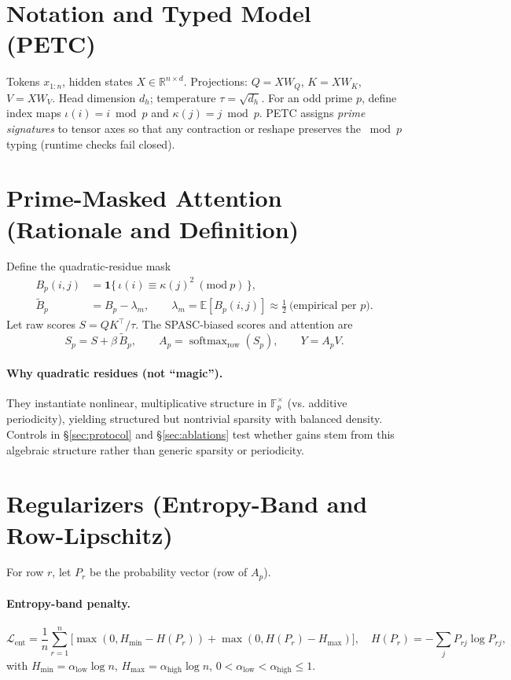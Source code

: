 \documentclass[11pt]{article}
\newcommand{\R}{\mathbb{R}}
\newcommand{\E}{\mathbb{E}}
\newcommand{\softmax}{\operatorname{softmax}}
\theoremstyle{definition}
\theoremstyle{remark}
\begin{document}
\section{Notation and Typed Model (PETC)}
Tokens $x_{1:n}$, hidden states $X\in\R^{n\times d}$. Projections: $Q=XW_Q$, $K=XW_K$, $V=XW_V$. Head dimension $d_h$; temperature $\tau=\sqrt{d_h}$. For an odd prime $p$, define index maps $\iota(i)=i\bmod p$ and $\kappa(j)=j\bmod p$. PETC assigns \emph{prime signatures} to tensor axes so that any contraction or reshape preserves the $\bmod p$ typing (runtime checks fail closed).

\section{Prime-Masked Attention (Rationale and Definition)}
Define the quadratic-residue mask
\begin{align}
  B_p(i,j) &= \mathbf{1}\{\, \iota(i) \equiv \kappa(j)^2 \ (\mathrm{mod}\ p)\,\},\\
  \widetilde{B}_p &= B_p - \lambda_m,\qquad \lambda_m = \E[B_p(i,j)] \approx \tfrac{1}{2}~\text{(empirical per $p$)}.
\end{align}
Let raw scores $S = QK^\top/\tau$. The SPASC-biased scores and attention are
\begin{equation}
  S_p = S + \beta\,\widetilde{B}_p, \qquad A_p = \softmax_{\text{row}}(S_p), \qquad Y = A_p V.
\end{equation}
\paragraph{Why quadratic residues (not ``magic'').}
They instantiate nonlinear, multiplicative structure in $\mathbb{F}_p^\times$ (vs. additive periodicity), yielding structured but nontrivial sparsity with balanced density. Controls in \S\ref{sec:protocol} and \S\ref{sec:ablations} test whether gains stem from this algebraic structure rather than generic sparsity or periodicity.

\section{Regularizers (Entropy-Band and Row-Lipschitz)}
For row $r$, let $P_r$ be the probability vector (row of $A_p$).
\paragraph{Entropy-band penalty.}
\begin{equation}
  \mathcal{L}_{\mathrm{ent}} = \frac{1}{n}\sum_{r=1}^n \Big[\max(0, H_{\min} - H(P_r)) + \max(0, H(P_r) - H_{\max})\Big],\quad H(P_r)=-\sum_j P_{rj}\log P_{rj},
\end{equation}
with $H_{\min}=\alpha_{\text{low}}\log n$, $H_{\max}=\alpha_{\text{high}}\log n$, $0<\alpha_{\text{low}}<\alpha_{\text{high}}\le 1$.
\end{document}
